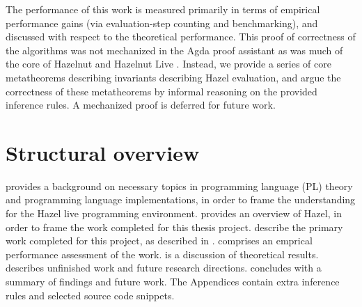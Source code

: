 The performance of this work is measured primarily in terms of empirical performance gains (via evaluation-step counting and benchmarking), and discussed with respect to the theoretical performance. This proof of correctness of the algorithms was not mechanized in the Agda proof assistant as was much of the core of Hazelnut \cite{conf/popl/Hazelnut17} and Hazelnut Live \cite{conf/popl/HazelnutLive19}. Instead, we provide a series of core metatheorems describing invariants describing Hazel evaluation, and argue the correctness of these metatheorems by informal reasoning on the provided inference rules. A mechanized proof is deferred for future work.

\section{Structural overview}
\label{sec:structural_overview}

 provides a background on necessary topics in programming language (PL) theory and programming language implementations, in order to frame the understanding for the Hazel live programming environment.  provides an overview of Hazel, in order to frame the work completed for this thesis project.  describe the primary work completed for this project, as described in .  comprises an emprical performance assessment of the work.  is a discussion of theoretical results.  describes unfinished work and future research directions.  concludes with a summary of findings and future work. The Appendices contain extra inference rules and selected source code snippets.

